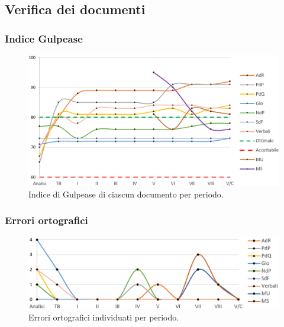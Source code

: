 \subsection{Verifica dei documenti}
\subsubsection{Indice Gulpease}

\begin{figure}[h]
	\centering
	\includegraphics[scale=0.55]{Images/gulpease nuovo}
	\caption{Indice di Gulpease di ciascun documento per periodo.}
\end{figure}
\subsubsection{Errori ortografici}

\begin{figure}[h]
	\centering
	\includegraphics[scale=0.55]{Images/errori}
	\caption{Errori ortograﬁci individuati per periodo.}
\end{figure}

\newpage